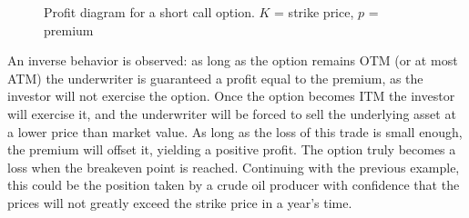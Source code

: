 \documentclass[english,12pt,a4paper,pdftex,sci,utf8]{aaltothesis}
\begin{document}
\begin{center}
\begin{figure}[H]
\centering
    \caption{Profit diagram for a short call option. $K$ = strike price, $p$ = premium}
    \label{fig:short_call_payoff}
\end{figure}
\end{center}

An inverse behavior is observed: as long as the option remains OTM (or at most ATM) the underwriter is guaranteed a profit equal to the premium, as the investor will not exercise the option. Once the option becomes ITM the investor will exercise it, and the underwriter will be forced to sell the underlying asset at a lower price than market value. As long as the loss of this trade is small enough, the premium will offset it, yielding a positive profit. The option truly becomes a loss when the breakeven point is reached. Continuing with the previous example, this could be the position taken by a crude oil producer with confidence that the prices will not greatly exceed the strike price in a year's time.
\end{document}
